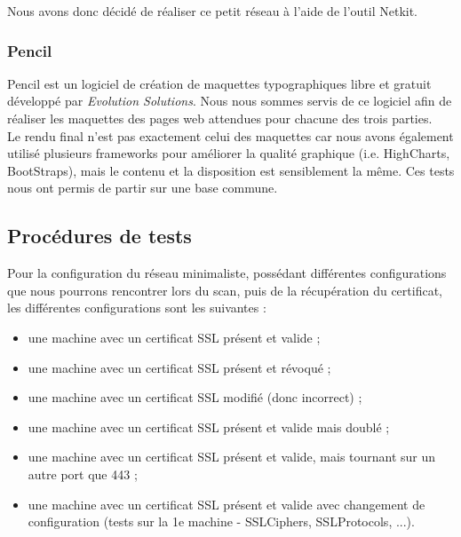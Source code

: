 Nous avons donc décidé de réaliser ce petit réseau à l'aide de l'outil Netkit.

\subsubsection{Pencil}

Pencil est un logiciel de création de maquettes typographiques libre et gratuit développé par \textit{Evolution Solutions}. Nous nous sommes servis de ce logiciel afin de réaliser les maquettes des pages web attendues pour chacune des trois parties.\\

Le rendu final n'est pas exactement celui des maquettes car nous avons également utilisé plusieurs frameworks pour améliorer la qualité graphique (i.e. HighCharts, BootStraps), mais le contenu et la disposition est sensiblement la même.
Ces tests nous ont permis de partir sur une base commune.

\subsection{Procédures de tests}

Pour la configuration du réseau minimaliste, possédant différentes configurations que nous pourrons rencontrer lors du scan, puis de la récupération du certificat, les différentes configurations sont les suivantes :
\begin{itemize}
\item une machine avec un certificat SSL présent et valide ;
\item une machine avec un certificat SSL présent et révoqué ;
\item une machine avec un certificat SSL modifié (donc incorrect) ;
\item une machine avec un certificat SSL présent et valide mais doublé ;
\item une machine avec un certificat SSL présent et valide, mais tournant sur un autre port que 443 ; 
\item une machine avec un certificat SSL présent et valide avec changement de configuration (tests sur la 1e machine - SSLCiphers, SSLProtocols, ...).
\end{itemize}

